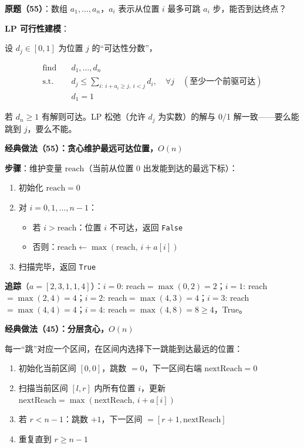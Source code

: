 \documentclass[12pt, a4paper]{ctexart}
\begin{document}
\begin{blackboard}

\textbf{原题（55）}：数组 $a_1, \ldots, a_n$，$a_i$ 表示从位置 $i$ 最多可跳 $a_i$ 步，能否到达终点？

\textbf{LP 可行性建模}：

设 $d_j \in [0,1]$ 为位置 $j$ 的``可达性分数''，

\begin{align}
\text{find} \quad & d_1, \ldots, d_n \\
\text{s.t.} \quad & d_j \leq \sum_{i:\ i + a_i \geq j,\ i < j} d_i, \quad \forall j \quad (\text{至少一个前驱可达}) \\
& d_1 = 1
\end{align}

若 $d_n \geq 1$ 有解则可达。LP 松弛（允许 $d_j$ 为实数）的解与 0/1 解一致——要么能跳到 $j$，要么不能。

\textbf{经典做法（55）：贪心维护最远可达位置，$O(n)$}

\textbf{步骤}：维护变量 $\text{reach}$（当前从位置 $0$ 出发能到达的最远下标）：
\begin{enumerate}
    \item 初始化 $\text{reach}=0$
    \item 对 $i = 0, 1, \ldots, n-1$：
        \begin{itemize}
            \item 若 $i > \text{reach}$：位置 $i$ 不可达，返回 \texttt{False}
            \item 否则：$\text{reach} \leftarrow \max(\text{reach},\, i + a[i])$
        \end{itemize}
    \item 扫描完毕，返回 \texttt{True}
\end{enumerate}

\textbf{追踪}（$a=[2,3,1,1,4]$）：$i=0$: reach$=\max(0,2)=2$；$i=1$: reach$=\max(2,4)=4$；$i=2$: reach$=\max(4,3)=4$；$i=3$: reach$=\max(4,4)=4$；$i=4$: reach$=\max(4,8)=8\geq 4$，True。

\textbf{经典做法（45）：分层贪心，$O(n)$}

每一``跳''对应一个区间，在区间内选择下一跳能到达最远的位置：
\begin{enumerate}
    \item 初始化当前区间 $[0, 0]$，跳数 $=0$，下一区间右端 $\text{nextReach}=0$
    \item 扫描当前区间 $[l, r]$ 内所有位置 $i$，更新 $\text{nextReach} = \max(\text{nextReach},\, i+a[i])$
    \item 若 $r < n-1$：跳数 $+1$，下一区间 $= [r+1, \text{nextReach}]$
    \item 重复直到 $r \geq n-1$
\end{enumerate}


\end{blackboard}
\end{document}

